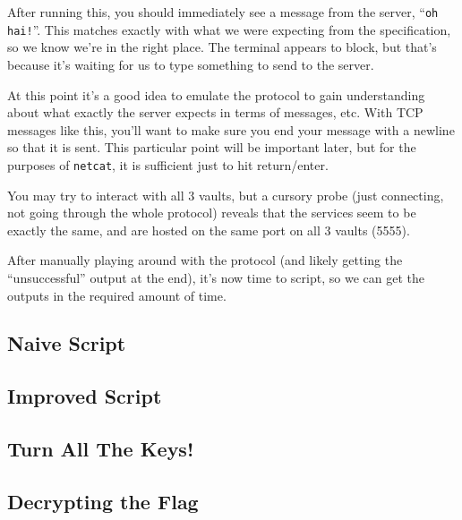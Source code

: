 \documentclass[11pt]{article}
\begin{document}
    After running this, you should immediately see a message from the server, ``\verb`oh hai!`''. This matches exactly with what we were expecting from the specification, so we know we're in the right place. The terminal appears to block, but that's because it's waiting for us to type something to send to the server.

    At this point it's a good idea to emulate the protocol to gain understanding about what exactly the server expects in terms of messages, etc. With TCP messages like this, you'll want to make sure you end your message with a newline so that it is sent. This particular point will be important later, but for the purposes of \verb`netcat`, it is sufficient just to hit return/enter.

    You may try to interact with all 3 vaults, but a cursory probe (just connecting, not going through the whole protocol) reveals that the services seem to be exactly the same, and are hosted on the same port on all 3 vaults (5555).

    \bigskip

    After manually playing around with the protocol (and likely getting the ``unsuccessful'' output at the end), it's now time to script, so we can get the outputs in the required amount of time.

    \subsection{Naive Script}\label{subsec:naive-script}

    \subsection{Improved Script}\label{subsec:improved-script}

    \subsection{Turn All The Keys!}\label{subsec:turn-all-the-keys}

    \subsection{Decrypting the Flag}\label{subsec:decrypting-the-flag}

\end{document}
